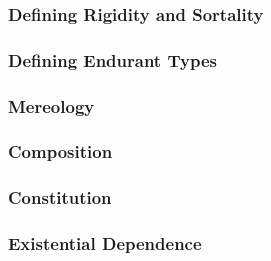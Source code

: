 \documentclass{article}
\newcommand{\BeginInstantationAndSpecialzation}{273}
\newcommand{\EndInstantationAndSpecialzation}{356}
\newcommand{\BeginRigidityAndSortality}{360}
\newcommand{\EndRigidityAndSortality}{626}
\newcommand{\BeginEndurantsTypesDefinition}{628}
\newcommand{\EndEndurantsTypesDefinition}{835}
\newcommand{\BeginMereology}{837}
\newcommand{\EndMereology}{888}
\newcommand{\BeginComposition}{886}
\newcommand{\EndComposition}{914}
\newcommand{\BeginConstitution}{916}
\newcommand{\EndConstitution}{959}
\begin{document}


\subsubsection{Defining Rigidity and Sortality}



\subsubsection{Defining Endurant Types}



\subsubsection{Mereology}



\subsubsection{Composition}



\subsubsection{Constitution}



\subsubsection{Existential Dependence}
\end{document}
